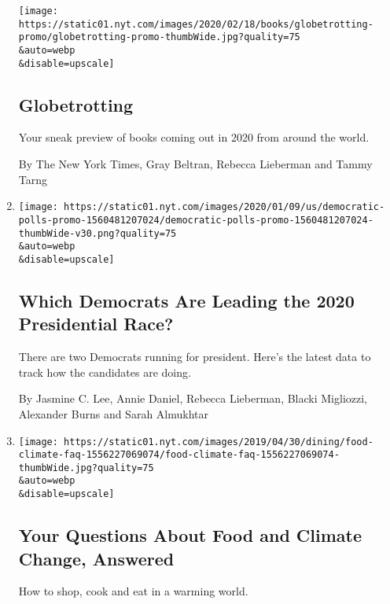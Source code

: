 \begin{enumerate}
  \texttt{[image: https://static01.nyt.com/images/2020/02/18/books/globetrotting-promo/globetrotting-promo-thumbWide.jpg?quality=75\\\&auto=webp\\\&disable=upscale]}

  \hypertarget{globetrotting}{%
  \subsection{Globetrotting}\label{globetrotting}}

  Your sneak preview of books coming out in 2020 from around the world.

  By The New York Times, Gray Beltran, Rebecca Lieberman and Tammy Tarng
\item
  \href{/interactive/2020/us/elections/democratic-polls.html}{}

  \texttt{[image: https://static01.nyt.com/images/2020/01/09/us/democratic-polls-promo-1560481207024/democratic-polls-promo-1560481207024-thumbWide-v30.png?quality=75\\\&auto=webp\\\&disable=upscale]}

  \hypertarget{which-democrats-are-leading-the-2020-presidential-race}{%
  \subsection{Which Democrats Are Leading the 2020 Presidential
  Race?}\label{which-democrats-are-leading-the-2020-presidential-race}}

  There are two Democrats running for president. Here's the latest data
  to track how the candidates are doing.

  By Jasmine C. Lee, Annie Daniel, Rebecca Lieberman, Blacki Migliozzi,
  Alexander Burns and Sarah Almukhtar
\item
  \href{/interactive/2019/04/30/dining/climate-change-food-eating-habits.html}{}

  \texttt{[image: https://static01.nyt.com/images/2019/04/30/dining/food-climate-faq-1556227069074/food-climate-faq-1556227069074-thumbWide.jpg?quality=75\\\&auto=webp\\\&disable=upscale]}

  \hypertarget{your-questions-about-food-and-climate-change-answered}{%
  \subsection{Your Questions About Food and Climate Change,
  Answered}\label{your-questions-about-food-and-climate-change-answered}}

  How to shop, cook and eat in a warming world.


\end{enumerate}
